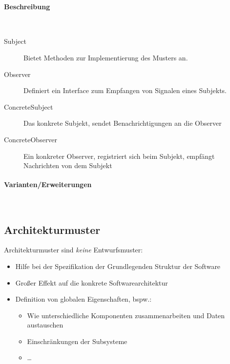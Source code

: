 \documentclass[ngerman]{tuda_summary}
\begin{document}
\paragraph{Beschreibung}\mbox{}\\
\begin{description}
    \item[Subject] Bietet Methoden zur Implementierung des Musters an.
    \item[Observer] Definiert ein Interface zum Empfangen von Signalen eines Subjekts.
    \item[ConcreteSubject] Das konkrete Subjekt, sendet Benachrichtigungen an die Observer
    \item[ConcreteObserver] Ein konkreter Observer, registriert sich beim Subjekt, empfängt Nachrichten von dem Subjekt
\end{description}

\paragraph{Varianten/Erweiterungen}\mbox{}\\

\subsection{Architekturmuster}
Architekturmuster sind \textit{keine} Entwurfsmuster:
\begin{itemize}
    \item Hilfe bei der Spezifikation der Grundlegenden Struktur der Software
    \item Großer Effekt auf die konkrete Softwarearchitektur
    \item Definition von globalen Eigenschaften, bspw.:
          \begin{itemize}
              \item Wie unterschiedliche Komponenten zusammenarbeiten und Daten austauschen
              \item Einschränkungen der Subsysteme
              \item \dots
          \end{itemize}
\end{itemize}
\end{document}

